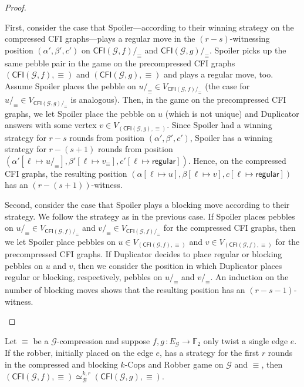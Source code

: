 \documentclass[a4paper,english, thm-restate]{lipics-v2021}
\newcommand{\regular}{\mathsf{regular}}
\newcommand{\comp}{\equiv}
\newcommand{\CFIsym}{\mathsf{CFI}}
\newcommand{\CFI}[1]{\CFIsym(#1)}
\newcommand{\compCFI}[2]{\CFI{#1}/_{#2}}
\newcommand{\precompCFI}[2]{{(\CFI{#1},#2)}}
\newcommand{\FF}{\mathbb{F}}
\newcommand{\graphG}{\mathcal{G}}
\newcommand{\edgeG}{E_{\graphG}}
\newcommand{\kbequivr}[2]{\simeq_{\mathcal{B}}^{#1,#2}}
\begin{document}
\begin{proof}
\begin{enumerate}
        First, consider the case that Spoiler---according to their winning strategy on the compressed CFI graphs---plays a regular move
        in the $(r-s)$-witnessing position $(\alpha', \beta', c')$
        on $\compCFI{\graphG,f}{\comp}$ and $\compCFI{\graphG,g}{\comp}$.
        Spoiler picks up the same pebble pair in the game on
        the precompressed CFI graphs  $\precompCFI{\graphG,f}{\comp}$ and $\precompCFI{\graphG,g}{\comp}$
        and plays a regular move, too.
        Assume Spoiler places the pebble on $u/_\comp \in V_{\compCFI{\graphG,f}{\comp}}$ (the case for $u/_\comp \in V_{\compCFI{\graphG,g}{\comp}}$ is analogous).
        Then, in the game on the precompressed CFI graphs,
        we let Spoiler place the pebble on $u$ (which is not unique)
        and Duplicator answers with some vertex $v \in V_{\precompCFI{\graphG,g}{\comp}}$. 
        Since Spoiler had a winning strategy for $r-s$ rounds from position $(\alpha', \beta', c')$,
        Spoiler has a winning strategy for $r-(s+1)$ rounds from position
        $(\alpha'[\ell \mapsto u/_\comp], \beta'[\ell \mapsto v_\comp], c'[\ell \mapsto \regular])$.
        Hence, on the compressed CFI graphs, the resulting position $(\alpha[\ell \mapsto u], \beta[\ell \mapsto v], c[\ell\mapsto \regular])$
        has an $(r-(s+1))$-witness.
        
        Second, consider the case that Spoiler plays a blocking move according to their strategy.
        We follow the strategy as in the previous case.
        If Spoiler places pebbles on  $u/_\comp \in V_{\compCFI{\graphG,f}{\comp}}$
        and  $v/_\comp \in V_{\compCFI{\graphG,f}{\comp}}$ for the compressed CFI graphs,
        then we let Spoiler place pebbles on  $u \in V_{\precompCFI{\graphG,f}{\comp}}$
        and  $v \in V_{\precompCFI{\graphG,f}{\comp}}$ for the precompressed CFI graphs.
        If Duplicator decides to place regular or blocking pebbles on $u$ and $v$, then we consider the position in which Duplicator places
        regular or blocking, respectively, pebbles on $u/_\comp$ and $v/_\comp$.
        An induction on the number of blocking moves
        shows that the resulting position has an $(r-s-1)$-witness.
\qedhere
        \end{enumerate}
\end{proof}
 
\begin{lemma} 
        Let $\comp$ be a $\graphG$-compression and 
        suppose $f,g \, \colon \edgeG \to \FF_2$ only twist a single edge $e$.
        If the robber, initially placed on the edge $e$, has a strategy for the first $r$ rounds in the compressed and blocking $k$-Cops and Robber game
        on $\graphG$ and $\comp$, then
        $\precompCFI{\graphG,f}{\comp} \kbequivr{k}{r} \precompCFI{\graphG,g}{\comp}$.
\end{lemma}
\end{document}
